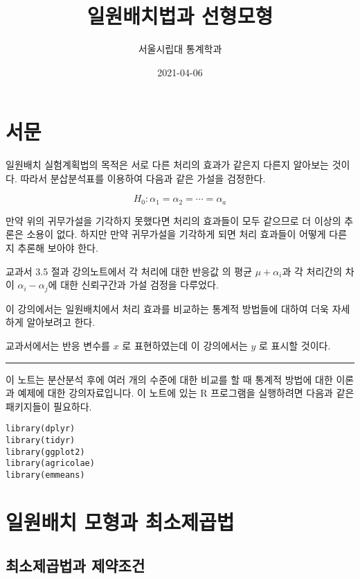 \documentclass[
]{book}
\title{일원배치법과 선형모형}
\author{서울시립대 통계학과}
\date{2021-04-06}
\makeatletter
\newenvironment{kframe}{%
\medskip{}
\setlength{\fboxsep}{.8em}
 \def\at@end@of@kframe{}%
 \ifinner\ifhmode%
  \def\at@end@of@kframe{\end{minipage}}%
  \begin{minipage}{\columnwidth}%
 \fi\fi%
 \def\FrameCommand##1{\hskip\@totalleftmargin \hskip-\fboxsep
 \colorbox{shadecolor}{##1}\hskip-\fboxsep
     \hskip-\linewidth \hskip-\@totalleftmargin \hskip\columnwidth}%
 \MakeFramed {\advance\hsize-\width
   \@totalleftmargin\z@ \linewidth\hsize
   \@setminipage}}%
 {\par\unskip\endMakeFramed%
 \at@end@of@kframe}
\newenvironment{rmdblock}[1]
  {
  \begin{itemize}
  \renewcommand{\labelitemi}{
    \raisebox{-.7\height}[0pt][0pt]{
      {\setkeys{Gin}{width=3em,keepaspectratio}\texttt{[image: images/\#1]}}
    }
  }
  \setlength{\fboxsep}{1em}
  \begin{kframe}
  \item
  }
  {
  \end{kframe}
  \end{itemize}
  }
\newenvironment{rmdcaution}
  {\begin{rmdblock}{caution}}
  {\end{rmdblock}}
\makeatother
\begin{document}
\maketitle

{
\setcounter{tocdepth}{1}
\tableofcontents
}
\hypertarget{uxc11cuxbb38}{%
\chapter*{서문}\label{uxc11cuxbb38}}


일원배치 실험계획법의 목적은 서로 다른 처리의 효과가 같은지 다른지 알아보는 것이다. 따라서 분삽분석표를 이용하여 다음과 같은 가설을 검정한다.

\[ H_0 : \alpha_1 = \alpha_2 = \cdots = \alpha_a \]

만약 위의 귀무가설을 기각하지 못했다면 처리의 효과들이 모두 같으므로 더 이상의 추론은 소용이 없다.
하지만 만약 귀무가설을 기각하게 되면 처리 효과들이 어떻게 다른지 추론해 보아야 한다.

교과서 3.5 절과 강의노트에서 각 처리에 대한 반응값 의 평균 \(\mu+\alpha_i\)과 각 처리간의 차이 \(\alpha_i - \alpha_j\)에 대한 신뢰구간과 가설 검정을 다루었다.

이 강의에서는 일원배치에서 처리 효과를 비교하는 통계적 방법들에 대하여 더욱 자세하게 알아보려고 한다.

\begin{rmdcaution}
교과서에서는 반응 변수를 \(x\) 로 표현하였는데 이 강의에서는 \(y\) 로 표시할 것이다.
\end{rmdcaution}

\begin{center}\rule{0.5\linewidth}{0.5pt}\end{center}

이 노트는 분산분석 후에 여러 개의 수준에 대한 비교를 할 때 통계적 방법에 대한 이론과 예제에 대한 강의자료입니다.
이 노트에 있는 R 프로그램을 실행하려면 다음과 같은 패키지들이 필요하다.

\begin{verbatim}
library(dplyr)
library(tidyr)
library(ggplot2)
library(agricolae)
library(emmeans)
\end{verbatim}

\mainmatter

\hypertarget{onewaylse}{%
\chapter{일원배치 모형과 최소제곱법}\label{onewaylse}}

\hypertarget{uxcd5cuxc18cuxc81cuxacf1uxbc95uxacfc-uxc81cuxc57duxc870uxac74}{%
\section{최소제곱법과 제약조건}\label{uxcd5cuxc18cuxc81cuxacf1uxbc95uxacfc-uxc81cuxc57duxc870uxac74}}
\end{document}
